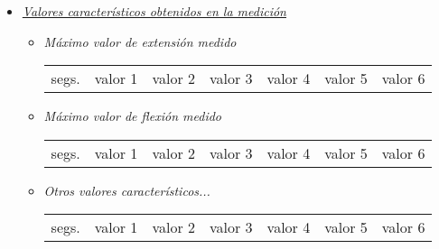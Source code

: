 \begin{itemize} [label=$ \rhd $]
	\item \textit{\underline{Valores característicos obtenidos en la medición}}
	\begin{itemize} [label= $  \triangleright $] \addtolength{\itemsep}{-5mm} %
		\item \textit{Máximo valor de extensión medido} \vspace{-6mm}
		\begin{table}[H]
			\hspace{2cm}
			\renewcommand{\arraystretch}{2}
			\begin{tabular}{ccccccc}
				segs.& valor 1 & valor 2 & valor 3 & valor 4 & valor 5 & valor 6  \\
			\end{tabular} 
		\end{table}	
		\item \textit{Máximo valor de flexión medido} \vspace{-6mm}
		\begin{table}[H]
			\hspace{2cm}
			\renewcommand{\arraystretch}{2}
			\begin{tabular}{ccccccc}
				segs.& valor 1 & valor 2 & valor 3 & valor 4 & valor 5 & valor 6  \\
			\end{tabular} 
		\end{table}	
		\item \textit{Otros valores característicos...} \vspace{-6mm}	
		\begin{table}[H]
			\hspace{2cm}
			\renewcommand{\arraystretch}{2}
			\begin{tabular}{ccccccc}
				segs.& valor 1 & valor 2 & valor 3 & valor 4 & valor 5 & valor 6  \\
			\end{tabular} 
		\end{table}	
	\end{itemize}
	

\end{itemize}
